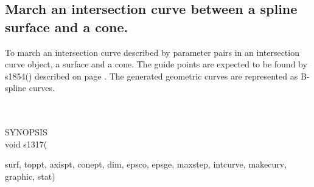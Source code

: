 \subsection{March an intersection curve between a spline surface and a cone.}
\begin{minipg1}
  To march an intersection curve described by parameter pairs in an intersection
  curve object, a surface and a cone.
  The guide points are expected to be found by s1854() described on
  page \pageref{s1854}.
  The generated geometric curves are represented as B-spline curves.
\end{minipg1} \\ \\
SYNOPSIS\\
        \>void s1317(\begin{minipg3}
        {\fov surf}, {\fov toppt}, {\fov axispt}, {\fov conept},
        {\fov dim}, {\fov epsco}, {\fov epsge}, {\fov maxstep},
        {\fov intcurve}, {\fov makecurv}, {\fov graphic}, {\fov stat})
                \end{minipg3}\\[0.3ex]

